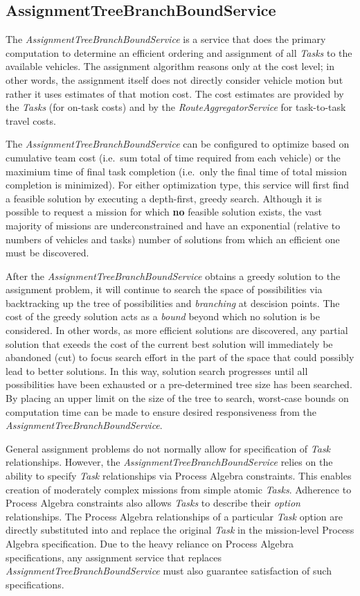 \subsection{AssignmentTreeBranchBoundService}\label{assignmenttreebranchboundservice}

The \emph{AssignmentTreeBranchBoundService} is a service that does the
primary computation to determine an efficient ordering and assignment of
all \emph{Tasks} to the available vehicles. The assignment algorithm
reasons only at the cost level; in other words, the assignment itself
does not directly consider vehicle motion but rather it uses estimates
of that motion cost. The cost estimates are provided by the \emph{Tasks}
(for on-task costs) and by the \emph{RouteAggregatorService} for
task-to-task travel costs.

The \emph{AssignmentTreeBranchBoundService} can be configured to
optimize based on cumulative team cost (i.e.~sum total of time required
from each vehicle) or the maximium time of final task completion
(i.e.~only the final time of total mission completion is minimized). For
either optimization type, this service will first find a feasible
solution by executing a depth-first, greedy search. Although it is
possible to request a mission for which \textbf{no} feasible solution
exists, the vast majority of missions are underconstrained and have an
exponential (relative to numbers of vehicles and tasks) number of
solutions from which an efficient one must be discovered.

After the \emph{AssignmentTreeBranchBoundService} obtains a greedy
solution to the assignment problem, it will continue to search the space
of possibilities via backtracking up the tree of possibilities and
\emph{branching} at descision points. The cost of the greedy solution
acts as a \emph{bound} beyond which no solution is be considered. In
other words, as more efficient solutions are discovered, any partial
solution that exeeds the cost of the current best solution will
immediately be abandoned (cut) to focus search effort in the part of the
space that could possibly lead to better solutions. In this way,
solution search progresses until all possibilities have been exhausted
or a pre-determined tree size has been searched. By placing an upper
limit on the size of the tree to search, worst-case bounds on
computation time can be made to ensure desired responsiveness from the
\emph{AssignmentTreeBranchBoundService}.

General assignment problems do not normally allow for specification of
\emph{Task} relationships. However, the
\emph{AssignmentTreeBranchBoundService} relies on the ability to specify
\emph{Task} relationships via Process Algebra constraints. This enables
creation of moderately complex missions from simple atomic \emph{Tasks}.
Adherence to Process Algebra constraints also allows \emph{Tasks} to
describe their \emph{option} relationships. The Process Algebra
relationships of a particular \emph{Task} option are directly
substituted into and replace the original \emph{Task} in the
mission-level Process Algebra specification. Due to the heavy reliance
on Process Algebra specifications, any assignment service that replaces
\emph{AssignmentTreeBranchBoundService} must also guarantee satisfaction
of such specifications.

